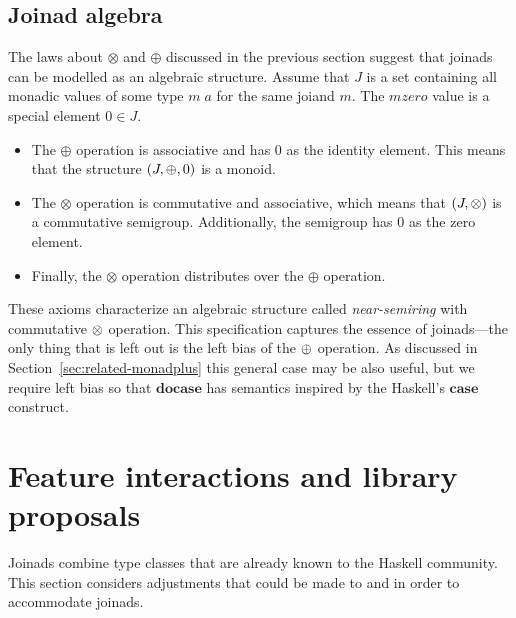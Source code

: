 \documentclass{sigplanconf}
\newcommand{\Varid}[1]{\mathit{#1}}
\begin{document}

\subsection{Joinad algebra} 
\label{sec:theory-algebra}

The laws about \ensuremath{\otimes} and \ensuremath{\oplus} discussed in the previous section suggest that 
joinads can be modelled as an algebraic structure. Assume that $J$ is a set containing all monadic 
values of some type \ensuremath{\Varid{m}\;\Varid{a}} for the same joiand \ensuremath{\Varid{m}}. The \ensuremath{\Varid{mzero}} value is a special element $0 \in J$.
\begin{itemize}
\item The \ensuremath{\oplus} operation is associative and has $0$ as the identity element. This means that the
  structure $(J, \oplus, 0)$ is a monoid.

\item The \ensuremath{\otimes} operation is commutative and associative, which means that $(J, \otimes)$ is a 
  commutative semigroup. Additionally, the semigroup has $0$ as the zero element.
  
\item Finally, the \ensuremath{\otimes} operation distributes over the \ensuremath{\oplus} operation.
\end{itemize}
These axioms characterize an algebraic structure called \textit{near-semiring} with commutative
$\otimes$ operation. This specification captures the essence of joinads---the only 
thing that is left out is the left bias of the $\oplus$ operation. As discussed in 
Section~\ref{sec:related-monadplus} this general case may be also useful, but we require left bias
so that \ensuremath{\mathbf{docase}} has semantics inspired by the Haskell's \ensuremath{\mathbf{case}} construct.


\section{Feature interactions and library proposals}
\label{sec:proposals}

Joinads combine type classes that are already known to the Haskell 
community. This section considers adjustments that could be made to  and 
 in order to accommodate joinads.
\end{document}
